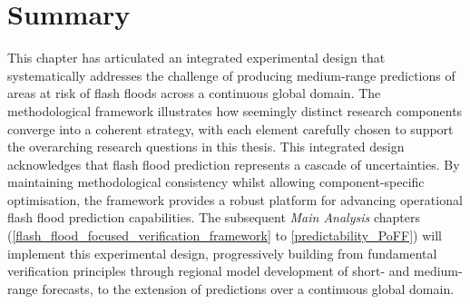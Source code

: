 \section{Summary}

This chapter has articulated an integrated experimental design that systematically addresses the challenge of producing medium-range predictions of areas at risk of flash floods across a continuous global domain. The methodological framework illustrates how seemingly distinct research components converge into a coherent strategy, with each element carefully chosen to support the overarching research questions in this thesis. This integrated design acknowledges that flash flood prediction represents a cascade of uncertainties. By maintaining methodological consistency whilst allowing component-specific optimisation, the framework provides a robust platform for advancing operational flash flood prediction capabilities. The subsequent \textit{Main Analysis} chapters (\ref{flash_flood_focused_verification_framework} to \ref{predictability_PoFF}) will implement this experimental design, progressively building from fundamental verification principles through regional model development of short- and medium-range forecasts, to the extension of predictions over a continuous global domain.